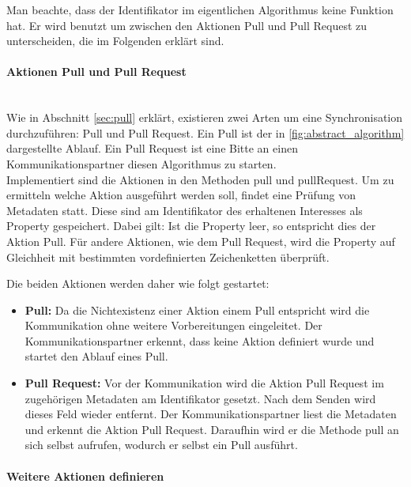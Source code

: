\documentclass[a4paper]{article}
\begin{document}
	Man beachte, dass der Identifikator im eigentlichen Algorithmus
	keine Funktion hat. Er wird	benutzt um zwischen den Aktionen Pull und Pull
	Request zu unterscheiden, die im Folgenden erklärt sind.	

	\paragraph{Aktionen Pull und Pull Request}\mbox{} \\
	
	Wie in Abschnitt \ref{sec:pull} erklärt, existieren zwei Arten um eine
	Synchronisation durchzuführen: Pull und Pull Request. Ein Pull ist der in
	\autoref{fig:abstract_algorithm} dargestellte Ablauf. Ein Pull Request ist
	eine Bitte an einen Kommunikationspartner diesen Algorithmus zu starten. \\
	
	Implementiert sind die Aktionen in den Methoden pull und pullRequest. Um
	zu ermitteln welche Aktion ausgeführt werden soll, findet eine Prüfung von
	Metadaten statt. Diese sind am Identifikator des erhaltenen Interesses
	als Property gespeichert. Dabei gilt: Ist die Property leer, so entspricht
	dies der Aktion Pull. Für andere Aktionen, wie dem Pull Request, wird die
	Property auf Gleichheit mit bestimmten vordefinierten Zeichenketten überprüft.
	
	Die beiden Aktionen werden daher wie folgt gestartet:
	
	\begin{itemize}
		\item \textbf{Pull:} Da die Nichtexistenz einer Aktion einem Pull 
		entspricht wird die Kommunikation ohne weitere Vorbereitungen eingeleitet.
		Der Kommunikationspartner erkennt, dass keine Aktion definiert wurde und
		startet den Ablauf eines Pull.
		\item \textbf{Pull Request:} Vor der Kommunikation wird die Aktion
		Pull Request im zugehörigen Metadaten am Identifikator gesetzt. Nach dem
		Senden wird dieses Feld wieder entfernt. Der Kommunikationspartner 
		liest die Metadaten und erkennt die Aktion Pull Request. Daraufhin wird
		er die Methode pull an sich selbst aufrufen, wodurch er selbst ein
		Pull ausführt.
	\end{itemize} 
	
	\newpage
	\paragraph{Weitere Aktionen definieren}\mbox{} \\
	
\end{document}
